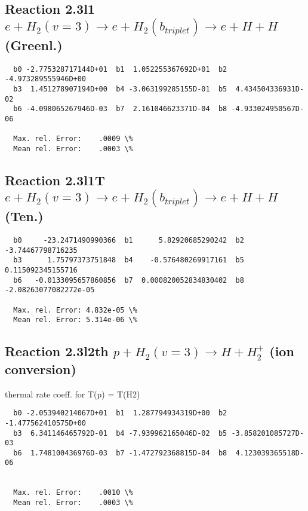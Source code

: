 \documentclass[12pt,dvipdfmx]{article}
\begin{document}
\subsection{
Reaction 2.3l1
$ e + H_2(v=3) \rightarrow e + H_2(b_{triplet}) \rightarrow e + H + H $ (Greenl.)
}


\begin{small}\begin{verbatim}
  b0 -2.775328717144D+01  b1  1.052255367692D+01  b2 -4.973289555946D+00
  b3  1.451278907194D+00  b4 -3.063199285155D-01  b5  4.434504336931D-02
  b6 -4.098065267946D-03  b7  2.161046623371D-04  b8 -4.933024950567D-06

  Max. rel. Error:    .0009 \%
  Mean rel. Error:    .0003 \%

\end{verbatim}\end{small}


\subsection{
Reaction 2.3l1T
$  e + H_2(v=3) \rightarrow e + H_2(b_{triplet})\rightarrow e + H + H $ (Ten.)
}


\begin{small}\begin{verbatim}
  b0     -23.2471490990366  b1      5.82920685290242  b2     -3.74467798716235
  b3      1.75797373751848  b4    -0.576480269917161  b5     0.115092345155716
  b6   -0.0133095657860856  b7  0.000820052834830402  b8 -2.08263077082272e-05

  Max. rel. Error: 4.832e-05 \%
  Mean rel. Error: 5.314e-06 \%
\end{verbatim}\end{small}


\subsection{
Reaction 2.3l2th
$ p + H_2(v=3) \rightarrow H + H_2^+$ (ion conversion)
}
thermal rate coeff. for T(p) = T(H2)

\begin{small}\begin{verbatim}
  b0 -2.053940214067D+01  b1  1.287794934319D+00  b2 -1.477562410575D+00
  b3  6.341146465792D-01  b4 -7.939962165046D-02  b5 -3.858201085727D-03
  b6  1.748100436976D-03  b7 -1.472792368815D-04  b8  4.123039365518D-06


  Max. rel. Error:    .0010 \%
  Mean rel. Error:    .0003 \%

\end{verbatim}\end{small}
\end{document}
